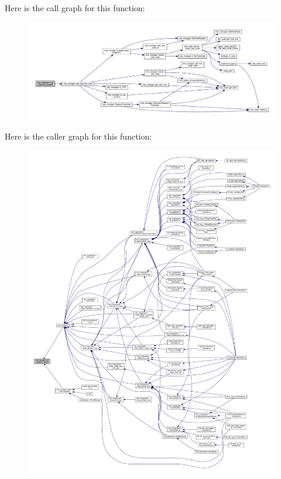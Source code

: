 Here is the call graph for this function\+:
\nopagebreak
\begin{figure}[H]
\begin{center}
\leavevmode
\includegraphics[width=350pt]{d2/ddd/classtree__manager_a9b84caccb4095fc91cbf434b0deb25a8_cgraph}
\end{center}
\end{figure}
Here is the caller graph for this function\+:
\nopagebreak
\begin{figure}[H]
\begin{center}
\leavevmode
\includegraphics[width=350pt]{d2/ddd/classtree__manager_a9b84caccb4095fc91cbf434b0deb25a8_icgraph}
\end{center}
\end{figure}
\mbox{\label{classtree__manager_a2bf93600d8a99ad30880216fa12c929f}} 
